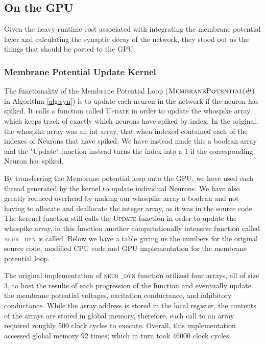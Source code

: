 \documentclass[a4paper]{article}
\begin{document}

\subsection{On the GPU}

Given the heavy runtime cost associated with integrating the membrane potential layer and calculating the synaptic decay of the network, they stood out as the things that should be ported to the GPU. 

\subsubsection{Membrane Potential Update Kernel}

The functionality of the Membrane Potential Loop ($\textsc{MembranePotential}(dt)$ in Algorithm \ref{alg:syn}) is to update each neuron in the network if the neuron has spiked.  It calls a function called \textsc{Update} in order to update the whospike array which keeps track of exactly which neurons have spiked by index. In the original, the whospike array was an int array, that when indexed contained each of the indexes of Neurons that have spiked. We have instead made this a boolean array and the "Update" function instead turns the index into a 1 if the corresponding Neuron has spiked.

By transferring the Membrane potential loop onto the GPU, we have used each thread generated by the kernel to update individual Neurons. We have also greatly reduced overhead by making our whospike array a boolean and not having to allocate and deallocate the integer array, as it was in the source code. The kerenel function still calls the \textsc{Update} function in order to update the whospike array, in this function another computationally intensive function called \textsc{neur\_dyn} is called. Below we have a table giving us the numbers for the original source code, modified CPU code and GPU implementation for the membrane potential loop.

The original implementation of \textsc{neur\_dyn} function utilized four arrays, all of size 3, to host the results of each progression of the function and eventually update the membrane potential voltages, excitation conductance, and inhibitory conductance. While the array address is stored in the local register, the contents of the arrays are stored in global memory, therefore, each call to an array required roughly 500 clock cycles to execute. Overall, this implementation accessed global memory 92 times; which in turn took 46000 clock cycles. 
\end{document}
